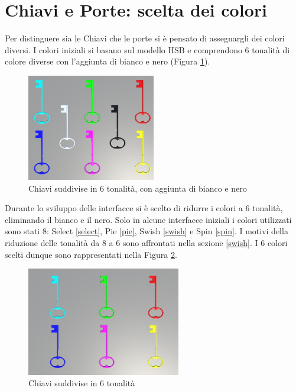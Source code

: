 \documentclass[target=bach,aauheader=]{thud}
\begin{document}
\section{Chiavi e Porte: scelta dei colori}
\label{keys}
Per distinguere sia le Chiavi che le porte si è pensato di assegnargli dei colori diversi.
I colori iniziali si basano sul modello HSB e comprendono 6 tonalità di colore diverse con l'aggiunta di bianco e nero (Figura \ref{fig:keys2}).

\begin{figure}[h]
    \centering
    \includegraphics[width=0.50\textwidth]{keys2}
    \caption{Chiavi suddivise in 6 tonalità, con aggiunta di bianco e nero}
    \label{fig:keys2}
\end{figure}
Durante lo sviluppo delle interfacce si è scelto di ridurre i colori a 6 tonalità, eliminando il bianco e il nero.
Solo in alcune interfacce iniziali i colori utilizzati sono stati 8: Select \ref{select}, Pie \ref{pie}, Swish \ref{swish} e Spin \ref{spin}. %
I motivi della riduzione delle tonalità da 8 a 6 sono affrontati nella sezione \ref{swish}. %
I 6 colori scelti dunque sono rappresentati nella Figura \ref{fig:keys}. \\

\begin{figure}[h]
    \centering
    \includegraphics[width=0.60\textwidth]{keys}
    \caption{Chiavi suddivise in 6 tonalità}
    \label{fig:keys}
\end{figure}
\end{document}
